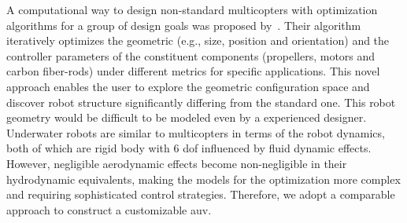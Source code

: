 A computational way to design non-standard multicopters with optimization algorithms for a group of design goals was proposed by~\cite{c1}. Their algorithm iteratively optimizes the geometric (e.g., size, position and orientation) and the controller parameters of the constituent components (propellers, motors and carbon fiber-rods) under different metrics for specific applications. This novel approach enables the user to explore the geometric configuration space and discover robot structure significantly differing from the standard one. This robot geometry would be difficult to be modeled even by a experienced designer. Underwater robots are similar to multicopters in terms of the robot dynamics, both of which are rigid body with 6 \ac{dof} influenced by fluid dynamic effects. However, negligible aerodynamic effects become non-negligible in their hydrodynamic equivalents, making the models for the optimization more complex and requiring sophisticated control strategies. Therefore, we adopt a comparable approach to construct a customizable \ac{auv}. 






